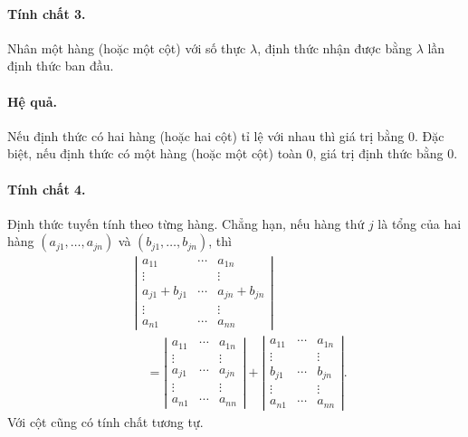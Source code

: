 \documentclass[11pt]{article}
\begin{document}
\paragraph{Tính chất 3.}
Nhân một hàng (hoặc một cột) với số thực \(\lambda\), định thức nhận được bằng
\(\lambda\) lần định thức ban đầu.

\paragraph{Hệ quả.}
Nếu định thức có hai hàng (hoặc hai cột) tỉ lệ với nhau thì giá trị bằng
\(0\). Đặc biệt, nếu định thức có một hàng (hoặc một cột) toàn \(0\), giá trị
định thức bằng \(0\).

\paragraph{Tính chất 4.}
Định thức tuyến tính theo từng hàng. Chẳng hạn, nếu hàng thứ \(j\) là tổng của
hai hàng \((a_{j1},\ldots,a_{jn})\) và \((b_{j1},\ldots,b_{jn})\), thì
\[
\begin{aligned}
&\left|\begin{matrix}
a_{11}&\cdots&a_{1n}\\
\vdots&&\vdots\\
a_{j1}+b_{j1}&\cdots&a_{jn}+b_{jn}\\
\vdots&&\vdots\\
a_{n1}&\cdots&a_{nn}
\end{matrix}\right| \\
&\quad =
\left|\begin{matrix}
a_{11}&\cdots&a_{1n}\\
\vdots&&\vdots\\
a_{j1}&\cdots&a_{jn}\\
\vdots&&\vdots\\
a_{n1}&\cdots&a_{nn}
\end{matrix}\right|
+
\left|\begin{matrix}
a_{11}&\cdots&a_{1n}\\
\vdots&&\vdots\\
b_{j1}&\cdots&b_{jn}\\
\vdots&&\vdots\\
a_{n1}&\cdots&a_{nn}
\end{matrix}\right|.
\end{aligned}
\]
Với cột cũng có tính chất tương tự.
\end{document}
